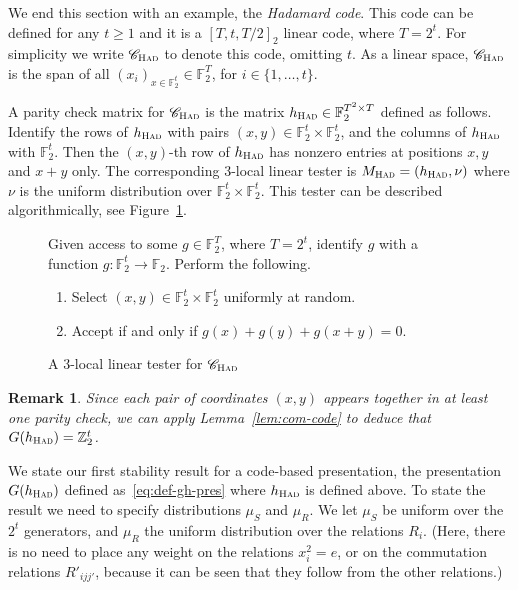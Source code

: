 \documentclass[11pt]{article}
\newtheorem{remark}[theorem]{Remark}
\theoremstyle{definition}
\newcommand{\code}{\mathscr{C}}
\newcommand{\field}{\mathbb{F}_2}
\newcommand{\F}{\ensuremath{\mathbb{F}}}
\newcommand{\Z}{\ensuremath{\mathbb{Z}}}
\newcommand{\had}{\textsc{Had}}
\newenvironment{gamespec}{
  \begin{mdframed}[style=figstyle]}{
  \end{mdframed}}
\begin{document}
We end this section with an example, the \emph{Hadamard code}. This code can be defined for any  $t\geq 1$ and it is a $[T,t,T/2]_2$ linear code, where $T=2^t$. For simplicity we write  $\code_\had$ to denote this code, omitting $t$. As a linear space, $\code_\had$ is the span of all $(x_i)_{x\in \field^t} \in \field^T$, for $i\in \{1,\ldots,t\}$.  

A parity check matrix for $\code_\had$ is the matrix $h_\had\in \F_2^{T^2\times T}$ defined as follows. Identify the rows of $h_\had$ with pairs $(x,y)\in \F_2^t\times \F_2^t$, and the columns of $h_\had$ with $\F_2^t$. Then the $(x,y)$-th row of $h_\had$ has nonzero entries at positions $x,y$ and $x+y$ only. 
The corresponding $3$-local linear tester is $M_\had = (h_\had,\nu)$ where $\nu$ is the uniform distribution over $\F_2^t \times \F_2^t$. This tester can be described algorithmically, see Figure~\ref{fig:test-had}. 

\begin{figure}[!htbp]
  \centering
  \begin{gamespec}
	Given access to some $g\in \F_2^T$, where $T=2^t$, identify $g$ with a function $g:\F_2^t\to\F_2$. Perform the following. 
\begin{enumerate}
\item Select $(x,y)\in \F_2^t \times \F_2^t$ uniformly at random. 
\item Accept if and only if $g(x)+g(y)+g(x+y)=0$.  	
    \end{enumerate}
  \end{gamespec}
  \caption{A $3$-local linear tester for $\code_{\had}$}
  \label{fig:test-had}
\end{figure}

\begin{remark}
Since each pair of coordinates $(x,y)$ appears together in at least one parity check, we can apply Lemma~\ref{lem:com-code} to deduce that $G(h_\had)=\Z_2^t$. 
\end{remark}

We state our first stability result for a code-based presentation, the presentation $G(h_\had)$ defined as~\eqref{eq:def-gh-pres} where $h_\had$ is defined above. To state the result we need to specify distributions $\mu_S$ and $\mu_R$. We let $\mu_S$ be uniform over the $2^t$ generators, and $\mu_R$ the uniform distribution over the relations $R_{i}$. (Here, there is no need to place any weight on the relations $x_i^2=e$, or on the commutation relations $R'_{ijj'}$, because it can be seen that they follow from the other relations.)  
\end{document}
